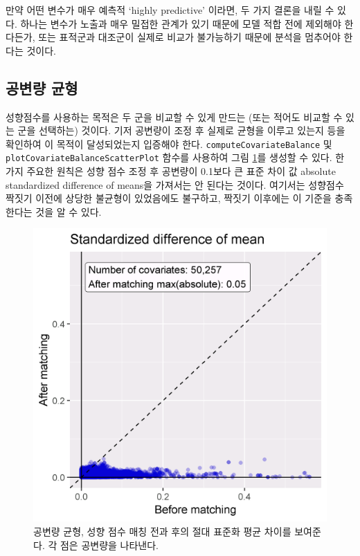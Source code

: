 \documentclass[10.5pt]{book}
\theoremstyle{definition}
\theoremstyle{definition}
\theoremstyle{definition}
\theoremstyle{remark}
\let\BeginKnitrBlock\begin \let\EndKnitrBlock\end
\begin{document}
\BeginKnitrBlock{rmdimportant}
만약 어떤 변수가 매우 예측적 `highly predictive' 이라면, 두 가지 결론을
내릴 수 있다. 하나는 변수가 노출과 매우 밀접한 관계가 있기 때문에 모델
적합 전에 제외해야 한다든가, 또는 표적군과 대조군이 실제로 비교가
불가능하기 때문에 분석을 멈추어야 한다는 것이다.
\EndKnitrBlock{rmdimportant}

\subsection{공변량 균형}\label{-}

성향점수를 사용하는 목적은 두 군을 비교할 수 있게 만드는 (또는 적어도
비교할 수 있는 군을 선택하는) 것이다. 기저 공변량이 조정 후 실제로
균형을 이루고 있는지 등을 확인하여 이 목적이 달성되었는지 입증해야 한다.
\texttt{computeCovariateBalance} 및
\texttt{plotCovariateBalanceScatterPlot} 함수를 사용하여 그림
\ref{fig:balance}를 생성할 수 있다. 한 가지 주요한 원칙은 성향 점수 조정
후 공변량이 0.1보다 큰 표준 차이 값 absolute standardized difference of
means을 가져서는 안 된다는 것이다. 여기서는 성향점수 짝짓기 이전에
상당한 불균형이 있었음에도 불구하고, 짝짓기 이후에는 이 기준을
충족한다는 것을 알 수 있다.

\begin{figure}

{\centering \includegraphics[width=0.7\linewidth]{images/PopulationLevelEstimation/balance} 

}

\caption{공변량 균형, 성향 점수 매칭 전과 후의 절대 표준화 평균 차이를 보여준다. 각 점은 공변량을 나타낸다.}\label{fig:balance}
\end{figure}
\end{document}
